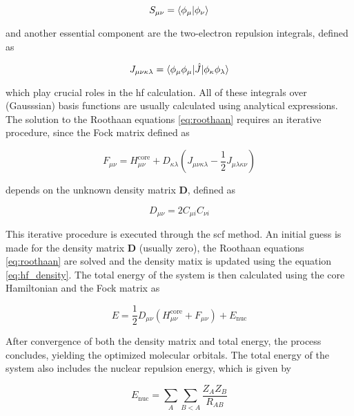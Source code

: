 \begin{equation}\label{eq:overlap}
S_{\mu\nu}=\braket{\phi_{\mu}|\phi_{\nu}}
\end{equation}

and another essential component are the two-electron repulsion integrals, defined as

\begin{equation}\label{eq:coulomb}
J_{\mu\nu\kappa\lambda}=\braket{\phi_{\mu}\phi_{\mu}|\hat{J}|\phi_{\kappa}\phi_{\lambda}}
\end{equation}

which play crucial roles in the \acrshort{hf} calculation. All of these integrals over (Gausssian) basis functions are usually calculated using analytical expressions.\cite{10.1016/S0065-3276!08!60019-2} The solution to the Roothaan equations \eqref{eq:roothaan} requires an iterative procedure, since the Fock matrix defined as

\begin{equation}\label{eq:fock}
F_{\mu\nu}=H_{\mu\nu}^{\mathrm{core}}+D_{\kappa\lambda}\left(J_{\mu\nu\kappa\lambda}-\frac{1}{2}J_{\mu\lambda\kappa\nu}\right)
\end{equation}

depends on the unknown density matrix \(\mathbf{D}\), defined as

\begin{equation}\label{eq:hf_density}
D_{\mu\nu}=2C_{\mu i}C_{\nu i}
\end{equation}

This iterative procedure is executed through the \acrfull{scf} method. An initial guess is made for the density matrix \(\mathbf{D}\) (usually zero), the Roothaan equations \eqref{eq:roothaan} are solved and the density matix is updated using the equation \eqref{eq:hf_density}. The total energy of the system is then calculated using the core Hamiltonian and the Fock matrix as

\begin{equation}
E=\frac{1}{2}D_{\mu\nu}(H_{\mu\nu}^{\mathrm{core}}+F_{\mu\nu})+E_{\mathrm{nuc}}
\end{equation}

After convergence of both the density matrix and total energy, the process concludes, yielding the optimized molecular orbitals. The total energy of the system also includes the nuclear repulsion energy, which is given by

\begin{equation}
E_{\mathrm{nuc}}=\sum_{A}\sum_{B<A}\frac{Z_{A}Z_{B}}{R_{AB}}
\end{equation}

